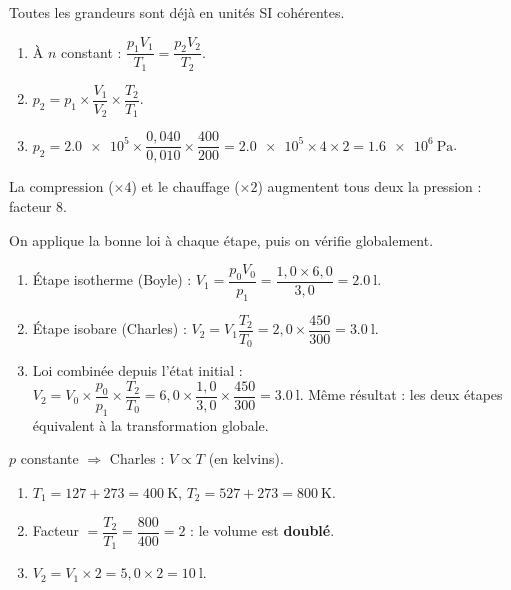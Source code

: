 \documentclass[11pt,a4paper]{article}
\begin{document}
\begin{corrige}[la loi combinée $pV/T=\text{cste}$]
Toutes les grandeurs sont déjà en unités SI cohérentes.
\begin{enumerate}[label=\alph*)]
  \item À $n$ constant : $\dfrac{p_1 V_1}{T_1}=\dfrac{p_2 V_2}{T_2}$.
  \item $p_2 = p_1\times\dfrac{V_1}{V_2}\times\dfrac{T_2}{T_1}$.
  \item $p_2 = \num{2.0e5}\times\dfrac{0{,}040}{0{,}010}\times\dfrac{400}{200}
        = \num{2.0e5}\times4\times2 = \qty{1.6e6}{\pascal}$.
\end{enumerate}
La compression ($\times4$) et le chauffage ($\times2$) augmentent tous deux la pression : facteur $8$.
\end{corrige}

\begin{corrige}
On applique la bonne loi à chaque étape, puis on vérifie globalement.
\begin{enumerate}[label=\alph*)]
  \item Étape isotherme (Boyle) : $V_1=\dfrac{p_0 V_0}{p_1}=\dfrac{1{,}0\times6{,}0}{3{,}0}=\qty{2.0}{\litre}$.
  \item Étape isobare (Charles) : $V_2=V_1\dfrac{T_2}{T_0}=2{,}0\times\dfrac{450}{300}=\qty{3.0}{\litre}$.
  \item Loi combinée depuis l'état initial :
        $V_2=V_0\times\dfrac{p_0}{p_1}\times\dfrac{T_2}{T_0}
        =6{,}0\times\dfrac{1{,}0}{3{,}0}\times\dfrac{450}{300}=\qty{3.0}{\litre}$. Même résultat :
        les deux étapes équivalent à la transformation globale.
\end{enumerate}
\end{corrige}

\begin{corrige}
$p$ constante $\Rightarrow$ Charles : $V\propto T$ (en kelvins).
\begin{enumerate}[label=\alph*)]
  \item $T_1=127+273=\qty{400}{\kelvin}$, $T_2=527+273=\qty{800}{\kelvin}$.
  \item Facteur $=\dfrac{T_2}{T_1}=\dfrac{800}{400}=2$ : le volume est \textbf{doublé}.
  \item $V_2=V_1\times2=5{,}0\times2=\qty{10}{\litre}$.
\end{enumerate}
\end{corrige}
\end{document}

